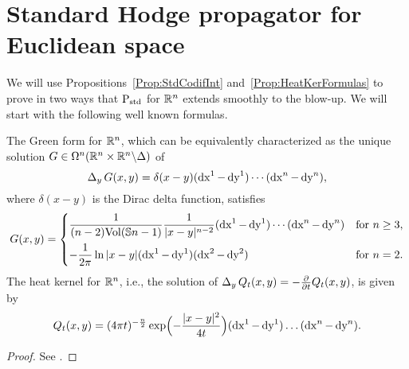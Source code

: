 \documentclass[\MainFolder/Text.tex]{subfiles}
\begin{document}
\section{Standard Hodge propagator for Euclidean space}\label{Sec:HeatRN}
\allowdisplaybreaks

We will use Propositions~\ref{Prop:StdCodifInt} and~\ref{Prop:HeatKerFormulas} to prove in two ways that $\mathrm{P}_{\mathrm{std}}$ for $\mathbb{R}^n$ extends smoothly to the blow-up. We will start with the following well known formulas.
\begin{Proposition}\label{Prop:GreenKernelRn}
The Green form for $\mathbb{R}^n$, which can be equivalently characterized as the unique solution $G\in \Omega^n(\mathbb{R}^n\times\mathbb{R}^n\backslash\Delta)$ of
\begin{equation}\label{Eq:GrRn}
\operatorname{\Delta}_y G(x,y) = \delta(x-y)(\operatorname{dx}^1-\operatorname{dy}^1)\dotsb(\operatorname{dx}^n-\operatorname{dy}^n),
\end{equation}
where $\delta(x-y)$ is the Dirac delta function, satisfies
$$ G(x,y) = \begin{cases}
\displaystyle\frac{1}{(n-2) \mathrm{Vol}(\mathbb{S}{n-1})} \frac{1}{|x-y|^{n-2}}(\operatorname{dx}^1 - \operatorname{dy}^1) \dotsb (\operatorname{dx}^n - \operatorname{dy}^n) & \text{for }n\ge 3, \\[1em]
-\dfrac{1}{2\pi}\ln |x-y|(\operatorname{dx}^1 - \operatorname{dy}^1)(\operatorname{dx}^2 - \operatorname{dy}^2)& \text{for }n=2.
\end{cases} $$
The heat kernel for $\mathbb{R}^n$, i.e., the solution of $\operatorname{\Delta}_y Q_t(x,y) = -\frac{\partial}{\partial t}Q_t(x,y)$,  is given by
\begin{equation}\label{Eq:EuclidHeatKer}
Q_t(x,y) = (4\pi t)^{-\frac{n}{2}}\exp\Bigl(-\frac{|x-y|^2}{4t}\Bigr) (\operatorname{dx}^1 - \operatorname{dy}^1)\ldots (\operatorname{dx}^n-\operatorname{dy}^n).
\end{equation}
\end{Proposition}
\begin{proof}
See \cite{BGV}.
\end{proof}
\end{document}
